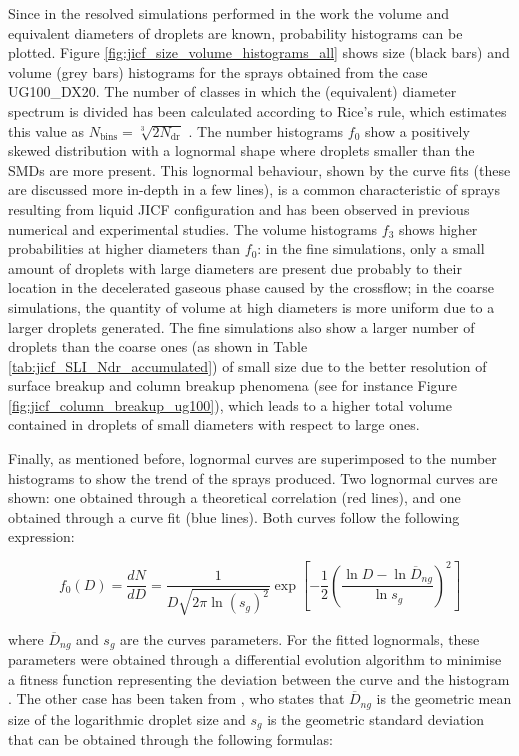 Since in the resolved simulations performed in the work the volume and equivalent diameters of droplets are known, probability histograms can be plotted. Figure \ref{fig:jicf_size_volume_histograms_all} shows size (black bars) and volume (grey bars) histograms for the sprays obtained from the case UG100\_DX20. The number of classes in which the (equivalent) diameter spectrum is divided has been calculated according to Rice's rule, which estimates this value as $N_\mathrm{bins} = \sqrt[3]{2 N_\mathrm{dr}}$ . The number histograms $f_0$ show a positively skewed distribution with a lognormal shape where droplets smaller than the SMDs are more present. This lognormal behaviour, shown by the curve fits (these are discussed more in-depth in a few lines), is a common characteristic of sprays resulting from liquid JICF configuration and has been observed in previous numerical  and experimental  studies. The volume histograms $f_3$ shows higher probabilities at higher diameters than $f_0$: in the fine simulations, only a small amount of droplets with large diameters are present due probably to their location in the decelerated gaseous phase caused by the crossflow; in the coarse simulations, the quantity of volume at high diameters is more uniform due to a larger droplets generated. The fine simulations also show a larger number of droplets than the coarse ones (as shown in Table \ref{tab:jicf_SLI_Ndr_accumulated}) of small size due to the better resolution of surface breakup and column breakup phenomena (see for instance Figure \ref{fig:jicf_column_breakup_ug100}), which leads to a higher total volume contained in droplets of small diameters with respect to large ones.

Finally, as mentioned before, lognormal curves are superimposed to the number histograms to show the trend of the sprays produced. Two lognormal curves are shown: one obtained through a theoretical correlation (red lines), and one obtained through a curve fit (blue lines). Both curves follow the following expression:

\begin{equation}
\label{eq:ch5_f0_lognormal_distr_expression}
 f_0 \left( D \right) = \frac{d N}{d D} =  \frac{1}{D  \sqrt{2 \pi \ln \left( s_g \right)^2}} \exp \left[ - \frac{1}{2 } \left( \frac{\ln D - \ln \overline{D}_{ng}}{\ln s_g}   \right)^2 \right]
\end{equation}

where $\overline{D}_{ng}$ and $s_g$ are the curves parameters. For the fitted lognormals, these parameters were obtained through a differential evolution algorithm to minimise a fitness function representing the deviation between the curve and the histogram . The other case has been taken from  , who states that $\overline{D}_{ng}$ is the geometric mean size of the logarithmic droplet size and $s_g$ is the geometric standard deviation that can be obtained through the following formulas: 

